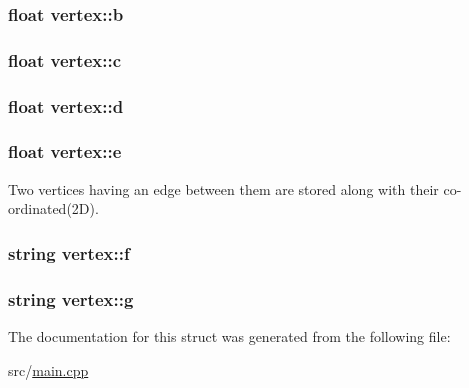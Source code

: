 \subsubsection[{\texorpdfstring{b}{b}}]{\setlength{\rightskip}{0pt plus 5cm}float vertex\+::b}\hypertarget{structvertex_a6df5b4f72e5950da15cdbaca18ac1230}{}\label{structvertex_a6df5b4f72e5950da15cdbaca18ac1230}
\subsubsection[{\texorpdfstring{c}{c}}]{\setlength{\rightskip}{0pt plus 5cm}float vertex\+::c}\hypertarget{structvertex_aa81f2ac6178fa638e21e0ffdbe55eeed}{}\label{structvertex_aa81f2ac6178fa638e21e0ffdbe55eeed}
\subsubsection[{\texorpdfstring{d}{d}}]{\setlength{\rightskip}{0pt plus 5cm}float vertex\+::d}\hypertarget{structvertex_a141c5cd092c8ba46392e5f068422f985}{}\label{structvertex_a141c5cd092c8ba46392e5f068422f985}
\subsubsection[{\texorpdfstring{e}{e}}]{\setlength{\rightskip}{0pt plus 5cm}float vertex\+::e}\hypertarget{structvertex_af8d8ef1d3668f17dd630f21b08e655af}{}\label{structvertex_af8d8ef1d3668f17dd630f21b08e655af}
Two vertices having an edge between them are stored along with their co-\/ordinated(2D). 
\subsubsection[{\texorpdfstring{f}{f}}]{\setlength{\rightskip}{0pt plus 5cm}string vertex\+::f}\hypertarget{structvertex_a5d46b53771d1b9d8b5cfb6029885e459}{}\label{structvertex_a5d46b53771d1b9d8b5cfb6029885e459}
\subsubsection[{\texorpdfstring{g}{g}}]{\setlength{\rightskip}{0pt plus 5cm}string vertex\+::g}\hypertarget{structvertex_a39517d9a99f88564f9df7b769bb6bc03}{}\label{structvertex_a39517d9a99f88564f9df7b769bb6bc03}


The documentation for this struct was generated from the following file\+:\begin{DoxyCompactItemize}
\item 
src/\hyperlink{main_8cpp}{main.\+cpp}\end{DoxyCompactItemize}
